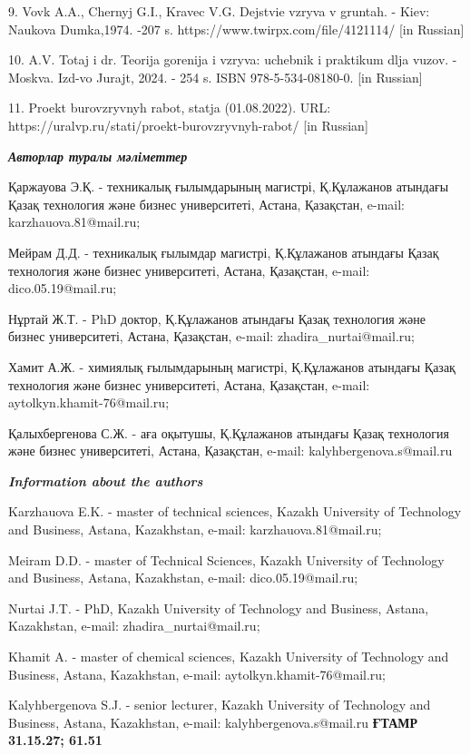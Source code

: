 9. Vovk A.A., Chernyj G.I., Kravec V.G. Dejstvie vzryva v gruntah. -
Kiev: Naukova Dumka,1974. -207 s. https://www.twirpx.com/file/4121114/
{[}in Russian{]}

10. A.V. Totaj i dr. Teorija gorenija i vzryva: uchebnik i praktikum
dlja vuzov. -Moskva. Izd-vo Jurajt, 2024. - 254 s. ISBN
978-5-534-08180-0. {[}in Russian{]}

11. Proekt burovzryvnyh rabot, stat\textquotesingle ja (01.08.2022).
URL: https://uralvp.ru/stati/proekt-burovzryvnyh-rabot/ {[}in Russian{]}

\emph{{\bfseries Авторлар туралы мәліметтер}}

Қаржауова Э.Қ. - техникалық ғылымдарының магистрі, Қ.Құлажанов атындағы
Қазақ технология және бизнес университеті, Астана, Қазақстан, e-mail:
karzhauova.81@mail.ru;

Мейрам Д.Д. - техникалық ғылымдар магистрі, Қ.Құлажанов атындағы Қазақ
технология және бизнес университеті, Астана, Қазақстан, e-mail:
dico.05.19@mail.ru;

Нұртай Ж.Т. - PhD доктор, Қ.Құлажанов атындағы Қазақ технология және
бизнес университеті, Астана, Қазақстан, e-mail: zhadira\_nurtai@mail.ru;

Хамит А.Ж. - химиялық ғылымдарының магистрі, Қ.Құлажанов атындағы Қазақ
технология және бизнес университеті, Астана, Қазақстан, e-mail:
aytolkyn.khamit-76@mail.ru;

Қалыхбергенова С.Ж. - аға оқытушы, Қ.Құлажанов атындағы Қазақ технология
және бизнес университеті, Астана, Қазақстан, e-mail:
kalyhbergenova.s@mail.ru

\emph{{\bfseries Information about the authors}}

Karzhauova E.K. - master of technical sciences, Kazakh University of
Technology and Business, Astana, Kazakhstan, e-mail:
karzhauova.81@mail.ru;

Meiram D.D. - master of Technical Sciences, Kazakh University of
Technology and Business, Astana, Kazakhstan, e-mail: dico.05.19@mail.ru;

Nurtai J.T. - PhD, Kazakh University of Technology and Business, Astana,
Kazakhstan, e-mail: zhadira\_nurtai@mail.ru;

Khamit A. - master of chemical sciences, Kazakh University of Technology
and Business, Astana, Kazakhstan, e-mail: aytolkyn.khamit-76@mail.ru;

Kalyhbergenova S.J. - senior lecturer, Kazakh University of Technology
and Business, Astana, Kazakhstan, e-mail: kalyhbergenova.s@mail.ru\newpage
{\bfseries ҒТАМР 31.15.27; 61.51}

